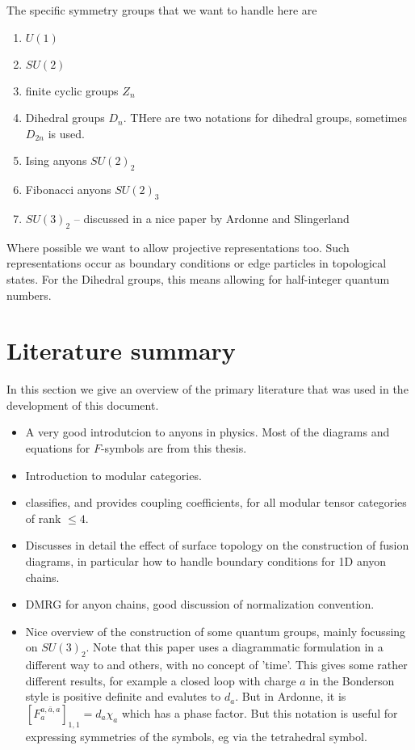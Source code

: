 \documentclass[12pt]{article}
\newcommand{\fsymbol}[6]{\mbox{$\left[ F^{#1,#2,#3}_{#4} \right]_{#5,#6}$}}
\begin{document}
The specific symmetry groups that we want to handle here are
\begin{enumerate}
\item $U(1)$
\item $SU(2)$
\item finite cyclic groups $Z_n$
\item Dihedral groups $D_n$. THere are two notations for dihedral groups, sometimes $D_{2n}$ is used.
\item Ising anyons $SU(2)_2$
\item Fibonacci anyons $SU(2)_3$
\item $SU(3)_2$ -- discussed in a nice paper by Ardonne and Slingerland\cite{Ardonne}
\end{enumerate}
Where possible we want to allow projective representations too. Such representations occur
as boundary conditions or edge particles in topological states. For the Dihedral
groups, this means allowing for half-integer quantum numbers.

\section{Literature summary}

In this section we give an overview of the primary literature that was used in the development of this document.

\begin{itemize}
\item \cite{Bonderson} A very good introdutcion to anyons in physics. Most of the diagrams and equations for $F$-symbols
are from this thesis.
\item \cite{MTC} Introduction to modular categories.
\item \cite{MTCClassification} classifies, and provides coupling coefficients, for all
modular tensor categories of rank $\leq 4$.
\item \cite{Pfeifer} Discusses in detail the effect of surface topology on the construction of fusion diagrams, in
particular how to handle boundary conditions for 1D anyon chains.
\item \cite{AnyonDMRG} DMRG for anyon chains, good discussion of normalization convention.
\item \cite{Ardonne} Nice overview of the construction of some quantum groups, mainly focussing on $SU(3)_2$.
Note that this paper uses a diagrammatic formulation in a different way to \cite{Bonderson} and others, 
with no concept of 'time'. This gives some rather different results, for example a closed loop with charge $a$
in the Bonderson style is positive definite and evalutes to $d_a$. But in Ardonne, it is 
$\fsymbol{a}{\bar{a}}{a}{a}{1}{1} = d_a \chi_a$ which has a phase factor. But this notation is useful for
expressing symmetries of the symbols, eg via the tetrahedral symbol.

\end{itemize}
\end{document}

